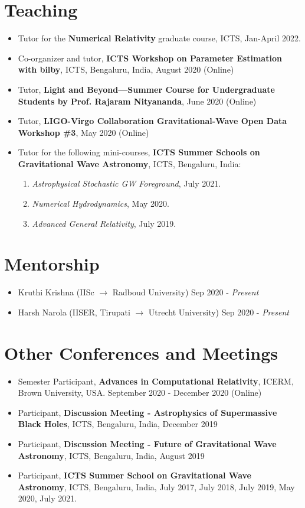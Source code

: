 \documentclass[margin, centered]{res}
\begin{document}
\begin{resume}
\section{Teaching}
\begin{itemize}[leftmargin=*]
	\item Tutor for the \textbf{Numerical Relativity} graduate course, ICTS, Jan-April 2022.
	\item Co-organizer and tutor, \textbf{ICTS Workshop on Parameter Estimation with bilby}, ICTS, Bengaluru, India, August 2020 (Online)
	\item Tutor, \textbf{Light and Beyond---Summer Course for Undergraduate Students by Prof. Rajaram Nityananda}, June 2020 (Online)
	\item Tutor, \textbf{LIGO-Virgo Collaboration Gravitational-Wave Open Data Workshop \#3}, May 2020 (Online)
	\item Tutor for the following mini-courses, \textbf{ICTS Summer Schools on Gravitational Wave Astronomy}, ICTS, Bengaluru, India:
	\begin{enumerate}
		\item \textit{Astrophysical Stochastic GW Foreground}, July 2021.
		\item \textit{Numerical Hydrodynamics}, May 2020.
		\item \textit{Advanced General Relativity}, July 2019.
	\end{enumerate}
\end{itemize}


\section{Mentorship}
\begin{itemize}[leftmargin=*]
	\item Kruthi Krishna (IISc $ \rightarrow $ Radboud University) \hfill Sep 2020 - \textit{Present}
	\item Harsh Narola (IISER, Tirupati $ \rightarrow $ Utrecht University) \hfill Sep 2020 - \textit{Present}
\end{itemize}

\section{Other Conferences and Meetings}
\begin{itemize}[leftmargin=*]
	\item Semester Participant, \textbf{Advances in Computational Relativity}, ICERM, Brown University, USA. September 2020 - December 2020 (Online)
	\item	Participant, \textbf{Discussion Meeting - Astrophysics of Supermassive Black Holes}, ICTS, Bengaluru, India, December 2019
	\item Participant, \textbf{Discussion Meeting - Future of Gravitational Wave Astronomy}, ICTS, Bengaluru, India, August 2019
	\item Participant, \textbf{ICTS Summer School on Gravitational Wave Astronomy}, ICTS, Bengaluru, India, July 2017, July 2018, July 2019, May 2020, July 2021.


\end{itemize}
\end{resume}
\end{document}
